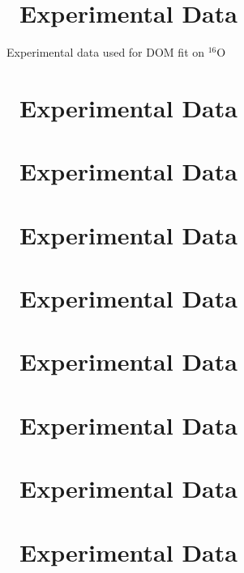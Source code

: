 \label{DOMDataSets}
\section{\oSix\ Experimental Data}

\begin{table*}[ht]
    \caption{Experimental data used for DOM fit on $^{16}$O}
    \label{tab:O16ExpData}
    \label{O16Data}
    \begin{center}
        
    \end{center}
\end{table*}

\section{\oEight\ Experimental Data}

\section{\caForty\ Experimental Data}

\section{\caEight\ Experimental Data}

\section{\niEight\ Experimental Data}

\section{\niFour\ Experimental Data}

\section{\snTwelve\ Experimental Data}

\section{\snFour\ Experimental Data}

\section{\pbEight\ Experimental Data}
